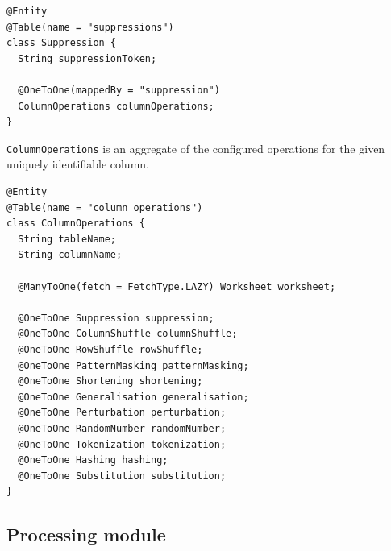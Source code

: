 \documentclass[a4paper,twoside,12pt]{book}
\begin{document}
\begin{verbatim}
@Entity
@Table(name = "suppressions")
class Suppression {
  String suppressionToken;

  @OneToOne(mappedBy = "suppression")
  ColumnOperations columnOperations;
}
\end{verbatim}

\verb|ColumnOperations| is an aggregate of the configured operations for the given uniquely identifiable column. \newline

\begin{verbatim}
@Entity
@Table(name = "column_operations")
class ColumnOperations {
  String tableName;
  String columnName;

  @ManyToOne(fetch = FetchType.LAZY) Worksheet worksheet;

  @OneToOne Suppression suppression;
  @OneToOne ColumnShuffle columnShuffle;
  @OneToOne RowShuffle rowShuffle;
  @OneToOne PatternMasking patternMasking;
  @OneToOne Shortening shortening;
  @OneToOne Generalisation generalisation;
  @OneToOne Perturbation perturbation;
  @OneToOne RandomNumber randomNumber;
  @OneToOne Tokenization tokenization;
  @OneToOne Hashing hashing;
  @OneToOne Substitution substitution;
}
\end{verbatim}

\subsection{Processing module}
\end{document}
